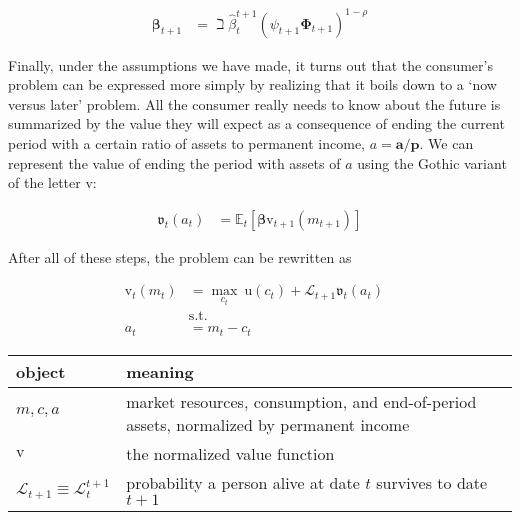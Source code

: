 \documentclass{article}
\newcommand{\CRRA}{\rho}
\newcommand{\uFunc}{\mathrm{u}}
\newcommand{\pLvl}{\mathbf{p}}
\newcommand{\DiscFac}{\beta}
\newcommand{\vFunc}{\mathrm{v}}
\newcommand{\Alive}{\mathcal{L}}
\newcommand{\Ex}{\mathbb{E}}
\newcommand{\permGroFac}{\Gamma}
\newcommand{\permShk}{\psi}
\newcommand{\tranShkEmp}{\xi}
\newcommand{\cNrm}{c}
\newcommand{\PermGroFac}{\pmb{\Phi}}
\newcommand{\Rfree}{\mathsf{R}}
\newcommand{\RNrm}{\mathcal{R}}
\newcommand{\aLvl}{\mathbf{a}}
\newcommand{\aNrm}{a}
\newcommand{\mNrm}{m}
\begin{document}
\begin{align}
    \pmb{\DiscFac}_{t+1} & = \beth \hat{\beta}_{t}^{t+1} (\permShk_{t+1} \PermGroFac_{t+1})^{1-\CRRA}
\end{align}


Finally, under the assumptions we have made, it turns out that the consumer's problem can be expressed more simply by realizing that it boils down to a `now versus later' problem.
All the consumer really needs to know about the future is summarized by the value they will expect as a consequence of ending the current period with a certain ratio of assets to permanent income, $\aNrm = \aLvl/\pLvl$. We can represent the value of ending the period with assets of $\aNrm$ using the Gothic variant of the letter $\vFunc$:

\begin{align}
    \mathfrak{v}_{t}(\aNrm_{t}) & = \Ex_{t}[\pmb{\DiscFac}\vFunc_{t+1}(\mNrm_{t+1})]
\end{align}

After all of these steps, the problem can be rewritten as

\begin{align}
    {\vFunc}_{t}({\mNrm}_{t}) & = \max_{\cNrm_{t}} ~ \uFunc(\cNrm_{t})+\Alive_{t+1} \mathfrak{v}_{t}(\aNrm_{t})
    \\ & \text{s.t.} &
    \\ \aNrm_{t} & = {\mNrm}_{t}-\cNrm_{t}
\end{align}

\bigskip\noindent
\begin{tabular}{p{}p{}}
\toprule
object & meaning \\
\hline
$\mNrm, \cNrm, \aNrm$ & market resources, consumption, and end-of-period assets, normalized by permanent income \\
$\vFunc$ & the normalized value function \\
$\Alive_{t+1} \equiv \Alive_{t}^{t+1}$ & probability a person alive at date $t$ survives to date $t+1$ \\
\bottomrule
\end{tabular}
\end{document}
